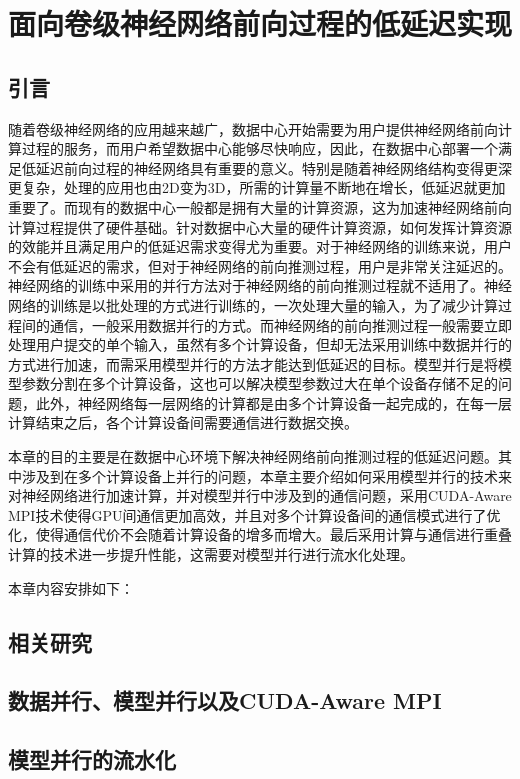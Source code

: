 \chapter{面向卷级神经网络前向过程的低延迟实现}
\section{引言}
随着卷级神经网络的应用越来越广，数据中心开始需要为用户提供神经网络前向计算过程的服务，而用户希望数据中心能够尽快响应，因此，在数据中心部署一个满足低延迟前向过程的神经网络具有重要的意义。特别是随着神经网络结构变得更深更复杂，处理的应用也由2D变为3D，所需的计算量不断地在增长，低延迟就更加重要了。而现有的数据中心一般都是拥有大量的计算资源，这为加速神经网络前向计算过程提供了硬件基础。针对数据中心大量的硬件计算资源，如何发挥计算资源的效能并且满足用户的低延迟需求变得尤为重要。对于神经网络的训练来说，用户不会有低延迟的需求，但对于神经网络的前向推测过程，用户是非常关注延迟的。神经网络的训练中采用的并行方法对于神经网络的前向推测过程就不适用了。神经网络的训练是以批处理的方式进行训练的，一次处理大量的输入，为了减少计算过程间的通信，一般采用数据并行的方式。而神经网络的前向推测过程一般需要立即处理用户提交的单个输入，虽然有多个计算设备，但却无法采用训练中数据并行的方式进行加速，而需采用模型并行的方法才能达到低延迟的目标。模型并行是将模型参数分割在多个计算设备，这也可以解决模型参数过大在单个设备存储不足的问题，此外，神经网络每一层网络的计算都是由多个计算设备一起完成的，在每一层计算结束之后，各个计算设备间需要通信进行数据交换。

本章的目的主要是在数据中心环境下解决神经网络前向推测过程的低延迟问题。其中涉及到在多个计算设备上并行的问题，本章主要介绍如何采用模型并行的技术来对神经网络进行加速计算，并对模型并行中涉及到的通信问题，采用CUDA-Aware MPI技术使得GPU间通信更加高效，并且对多个计算设备间的通信模式进行了优化，使得通信代价不会随着计算设备的增多而增大。最后采用计算与通信进行重叠计算的技术进一步提升性能，这需要对模型并行进行流水化处理。

本章内容安排如下：

\section{相关研究}

\section{数据并行、模型并行以及CUDA-Aware MPI}

\section{模型并行的流水化}

